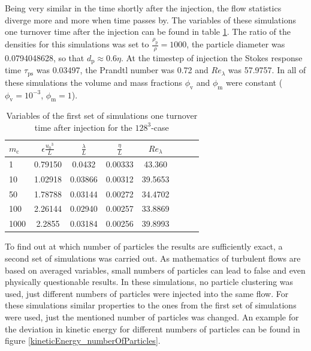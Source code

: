 \documentclass[11pt,a4paper,openany,oneside,parskip=half*]{article}
\begin{document}
\newline
Being very similar in the time shortly after the injection, the flow statistics diverge more and more when time passes by. The variables of these simulations one turnover time after the injection can be found in table \ref{table_properties}. The ratio of the densities for this simulations was set to $\frac{\rho_\mathrm{p}}{\rho} = 1000$, the particle diameter was 0.0794048628, so that $d_\mathrm{p} \approx 0.6 \eta$. At the timestep of injection the Stokes response time $\tau_\mathrm{ps}$ was 0.03497, the Prandtl number was 0.72 and $Re_\lambda$ was 57.9757. In all of these simulations the volume and mass fractions $\phi_\mathrm{v}$ and $\phi_\mathrm{m}$ were constant ($\phi_\mathrm{v}= 10^{-3}$, $\phi_\mathrm{m}=1$). 
\begin{table}[h]
\begin{center}
\begin{tabular}{l | c c c c c c c }
$m_\mathrm{c}$ & $\epsilon \frac{{u_0}^3}{L}$ & $\frac{\lambda}{L}$ & $\frac{\eta}{L} $ & $Re_\lambda$ \\
\hline
\hline
1 & 0.79150 & 0.0432 & 0.00333 & 43.360 &\\
10 & 1.02918 & 0.03866 & 0.00312 & 39.5653 &\\
50 & 1.78788 & 0.03144 & 0.00272 & 34.4702 &\\
100 & 2.26144 & 0.02940 & 0.00257 & 33.8869 &\\
1000 & 2.2855 & 0.03184 & 0.00256 & 39.8993 &\\
\hline
\end{tabular}
\caption{Variables of the first set of simulations one turnover time after injection for the $128^3$-case}
\label{table_properties}
\end{center}
\end{table}
\newline
To find out at which number of particles the results are sufficiently exact, a second set of simulations was carried out. As mathematics of turbulent flows are based on averaged variables, small numbers of particles can lead to false and even physically questionable results. In these simulations, no particle clustering was used, just different numbers of particles were injected into the same flow. For these simulations similar properties to the ones from the first set of simulations were used, just the mentioned number of particles was changed. An example for the deviation in kinetic energy for different numbers of particles can be found in figure \ref{kineticEnergy_numberOfParticles}. 
\end{document}

